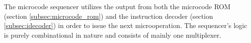 \label{subsec:microseq}
The microcode sequencer utilizes the output from both the microcode ROM
(section \ref{subsec:microcode_rom}) and the instruction decoder (section
\ref{subsec:idecoder}) in order to issue the next microoperation. The
sequencer's logic is purely combinational in nature and consists of mainly one
multiplexer.
